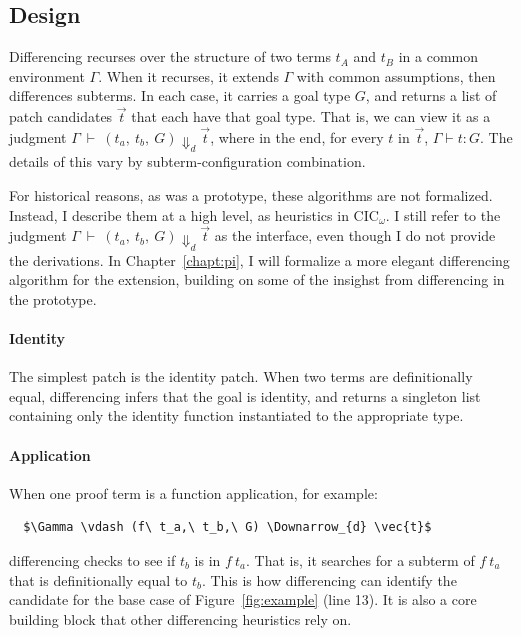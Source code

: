 \subsection{Design}
\label{sec:pumpkin-diff-design}


Differencing recurses over the structure of two terms $t_A$ and $t_B$ in a common environment $\Gamma$.
When it recurses, it extends $\Gamma$ with common assumptions, then differences subterms.
In each case, it carries a goal type $G$, and returns a list of patch candidates $\vec{t}$ that each have that goal type.
That is, we can view it as a judgment $\Gamma\ \vdash\ (t_a,\ t_b,\ G) \Downarrow_{d} \vec{t}$,
where in the end, for every $t$ in $\vec{t}$, $\Gamma \vdash t : G$.
The details of this vary by subterm-configuration combination.

For historical reasons, as \sysname was a prototype, these algorithms are not formalized.
Instead, I describe them at a high level, as heuristics in CIC$_{\omega}$.
I still refer to the judgment $\Gamma\ \vdash\ (t_a,\ t_b,\ G) \Downarrow_{d} \vec{t}$ as the interface,
even though I do not provide the derivations.
In Chapter~\ref{chapt:pi}, I will formalize a more elegant differencing algorithm for the \toolnamec extension,
building on some of the insighst from differencing in the \sysname prototype.

\paragraph{Identity}
The simplest patch is the identity patch.
When two terms are definitionally equal, %
differencing infers that the goal is identity,
and returns a singleton list containing only the identity function instantiated to the appropriate type.

\paragraph{Application}
When one proof term is a function application, for example:

\begin{lstlisting}
  $\Gamma \vdash (f\ t_a,\ t_b,\ G) \Downarrow_{d} \vec{t}$
\end{lstlisting}
differencing checks to see if $t_b$ is in $f\ t_a$.
That is, it searches for a subterm of $f\ t_a$ that is definitionally equal to $t_b$.
This is how differencing can identify the candidate for the base case of Figure~\ref{fig:example} (line 13).
It is also a core building block that other differencing heuristics rely on.


